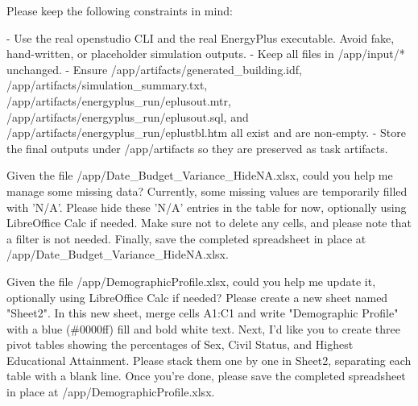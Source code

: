 \begin{instructionbox}
Please keep the following constraints in mind:

- Use the real \textasciigrave{}openstudio\textasciigrave{} CLI and the real EnergyPlus executable. Avoid fake, hand-written, or placeholder simulation outputs.
- Keep all files in \textasciigrave{}/app/input/*\textasciigrave{} unchanged.
- Ensure \textasciigrave{}/app/artifacts/generated\_building.idf\textasciigrave{}, \textasciigrave{}/app/artifacts/simulation\_summary.txt\textasciigrave{}, \textasciigrave{}/app/artifacts/energyplus\_run/eplusout.mtr\textasciigrave{}, \textasciigrave{}/app/artifacts/energyplus\_run/eplusout.sql\textasciigrave{}, and \textasciigrave{}/app/artifacts/energyplus\_run/eplustbl.htm\textasciigrave{} all exist and are non-empty.
- Store the final outputs under \textasciigrave{}/app/artifacts\textasciigrave{} so they are preserved as task artifacts.
\end{instructionbox}

\begin{instructionbox}
Given the file \textasciigrave{}/app/Date\_Budget\_Variance\_HideNA.xlsx\textasciigrave{}, could you help me manage some missing data? Currently, some missing values are temporarily filled with 'N/A'. Please hide these 'N/A' entries in the table for now, optionally using LibreOffice Calc if needed. Make sure not to delete any cells, and please note that a filter is not needed. Finally, save the completed spreadsheet in place at \textasciigrave{}/app/Date\_Budget\_Variance\_HideNA.xlsx\textasciigrave{}.
\end{instructionbox}

\begin{instructionbox}
Given the file \textasciigrave{}/app/DemographicProfile.xlsx\textasciigrave{}, could you help me update it, optionally using LibreOffice Calc if needed? Please create a new sheet named "Sheet2". In this new sheet, merge cells A1:C1 and write "Demographic Profile" with a blue (\#0000ff) fill and bold white text. Next, I'd like you to create three pivot tables showing the percentages of Sex, Civil Status, and Highest Educational Attainment. Please stack them one by one in Sheet2, separating each table with a blank line. Once you're done, please save the completed spreadsheet in place at \textasciigrave{}/app/DemographicProfile.xlsx\textasciigrave{}.
\end{instructionbox}


